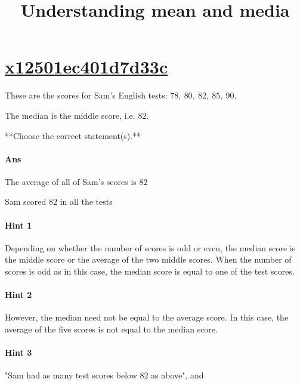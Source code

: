 \documentclass[twocolumn,10pt]{article}
\title{Understanding mean and media}
\begin{document}
\maketitle



\section{\href{https://www.khanacademy.org/devadmin/content/items/x12501ec401d7d33c}{x12501ec401d7d33c}}

\noindent
These are the scores for Sam's English tests: $78, ~80,~ 82,~ 85,~ 90$. 

The median is the middle score, i.e. $ 82$. 

**Choose the correct statement(s).**

\paragraph{Ans} 



 The average of all of Sam's scores is $82$

Sam scored $82$ in all the tests



\paragraph{Hint 1}Depending on whether the number of scores is odd or even, the median score is the middle score or the average of the two middle scores.  When the number of scores is odd as in this case, the median score is equal to one of the test scores.  

\paragraph{Hint 2}However, the median need not be equal to the average score.  In this case, the average of the five scores is not equal to the median score.

\paragraph{Hint 3}"Sam had as many test scores below $82$ as above", and
\end{document}
